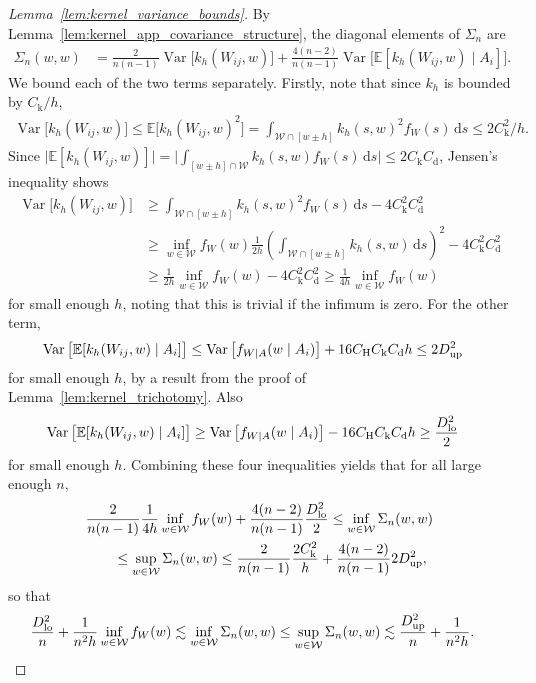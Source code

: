 \documentclass[11pt,lof]{puthesis}
\newcommand{\E}{\ensuremath{\mathbb{E}}}
\newcommand{\rH}{\ensuremath{\mathrm{H}}}
\newcommand{\rk}{\ensuremath{\mathrm{k}}}
\newcommand{\rd}{\ensuremath{\mathrm{d}}}
\newcommand{\cW}{\ensuremath{\mathcal{W}}}
\newcommand{\Dl}{\ensuremath{D_{\textup{lo}}}}
\newcommand{\Du}{\ensuremath{D_{\textup{up}}}}
\DeclareMathOperator{\Var}{Var}
\newcommand{\diff}[1]{\,\mathrm{d}#1}
\theoremstyle{break}
\theoremstyle{proof}
\newtheorem{proof}{Proof}
\begin{document}
\begin{proof}[Lemma~\ref{lem:kernel_variance_bounds}]

By Lemma~\ref{lem:kernel_app_covariance_structure},
the diagonal elements of $\Sigma_n$ are
%
\begin{align*}
\Sigma_n(w,w)
&=
\frac{2}{n(n-1)}
\Var\big[
k_h(W_{i j},w)
\big]
+
\frac{4(n-2)}{n(n-1)}
\Var\big[
\E[k_h(W_{i j},w) \mid A_i]
\big].
\end{align*}
%
We bound each of the two terms separately.
Firstly, note that since $k_h$ is bounded by $C_\rk/h$,
%
\begin{align*}
\Var\big[
k_h(W_{i j},w)
\big]
\leq
\E\big[
k_h(W_{i j},w)^2
\big]
=
\int_{\cW \cap [w \pm h]}
k_h(s,w)^2
f_W(s)
\diff{s}
\leq 2 C_\rk^2 / h.
\end{align*}
%
Since $\big|\E[k_h(W_{i j},w)]\big|
= \big|\int_{[w \pm h] \cap \cW} k_h(s,w) f_W(s) \diff{s}\big|
\leq 2 C_\rk C_\rd$, Jensen's inequality shows
%
\begin{align*}
\Var\big[
k_h(W_{i j},w)
\big]
&\geq
\int_{\cW \cap [w \pm h]}
k_h(s,w)^2
f_W(s)
\diff{s}
- 4 C_\rk^2 C_\rd^2 \\
&\geq
\inf_{w \in \cW} f_W(w)
\frac{1}{2h}
\left(
\int_{\cW \cap [w \pm h]}
k_h(s,w)
\diff{s}
\right)^2
- 4 C_\rk^2 C_\rd^2 \\
&\geq
\frac{1}{2h}
\inf_{w \in \cW} f_W(w)
- 4 C_\rk^2 C_\rd^2
\geq
\frac{1}{4h}
\inf_{w \in \cW} f_W(w)
\end{align*}
%
for small enough $h$, noting that this is trivial if the infimum is zero.
For the other term,
%
\begin{align*}
\Var\big[
\E[k_h(W_{i j},w) \mid A_i]
\big]
&\leq
\Var\big[
f_{W \mid A}(w \mid A_i)
\big]
+ 16 C_\rH C_\rk C_\rd h
\leq
2 \Du^2
\end{align*}
%
for small enough $h$, by a result from
the proof of Lemma~\ref{lem:kernel_trichotomy}.
Also
%
\begin{align*}
\Var\big[
\E[k_h(W_{i j},w) \mid A_i]
\big]
&\geq
\Var\big[
f_{W \mid A}(w \mid A_i)
\big]
- 16 C_\rH C_\rk C_\rd h
\geq
\frac{\Dl^2}{2}
\end{align*}
%
for small enough $h$.
Combining these four inequalities yields
that for all large enough $n$,
%
\begin{align*}
&\frac{2}{n(n-1)}
\frac{1}{4h}
\inf_{w \in \cW} f_W(w)
+ \frac{4(n-2)}{n(n-1)}
\frac{\Dl^2}{2}
\leq
\inf_{w \in \cW} \Sigma_n(w,w) \\
&\qquad\leq
\sup_{w \in \cW} \Sigma_n(w,w)
\leq
\frac{2}{n(n-1)}
\frac{2 C_\rk^2}{h}
+ \frac{4(n-2)}{n(n-1)}
2 \Du^2,
\end{align*}
%
so that
%
\begin{align*}
\frac{\Dl^2}{n}
+ \frac{1}{n^2h}
\inf_{w \in \cW} f_W(w)
&\lesssim
\inf_{w \in \cW} \Sigma_n(w,w)
\leq
\sup_{w \in \cW} \Sigma_n(w,w)
\lesssim
\frac{\Du^2}{n}
+ \frac{1}{n^2h}.
\end{align*}
\end{proof}
\end{document}
